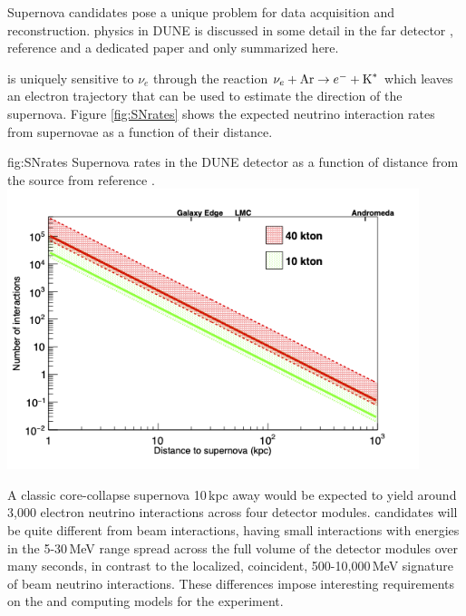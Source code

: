 \documentclass[../main-v1.tex]{subfiles}
\begin{document}
Supernova candidates pose a unique problem for data acquisition and reconstruction.   physics in DUNE is discussed in some detail in the far detector \cite{ Abi:2020evt}, reference \cite{Cuesta:2020dyj} and a dedicated paper \cite{DUNE:2020zfm} and only summarized here. 

 is uniquely sensitive to $\nu_e$ through the reaction $\nu_e + \hbox{Ar} \rightarrow e^- + \hbox{K}^*$ which leaves an electron trajectory that can be used to estimate the direction of the supernova.  Figure \ref{fig:SNrates} shows the expected neutrino interaction rates from supernovae as a function of their distance.

\begin{dunefigure}
{fig:SNrates}
{Supernova rates in the DUNE detector  as a function of distance from the source from reference \cite{DUNE:2020zfm}.}
{\includegraphics[width=0.9\textwidth]{graphics/IntroFigures/argon_sn.png}}
\end{dunefigure}

A classic core-collapse supernova 10\,kpc away would be expected to yield around 3,000   electron neutrino interactions across four detector modules.  candidates will be quite different from beam interactions, having small interactions with energies in the 5-30\,MeV range spread across the full volume of the detector modules over many seconds, in contrast to the localized, coincident,  500-10,000\,MeV signature of beam neutrino interactions. These differences impose interesting requirements on the  and computing models for the experiment.  
\end{document}
